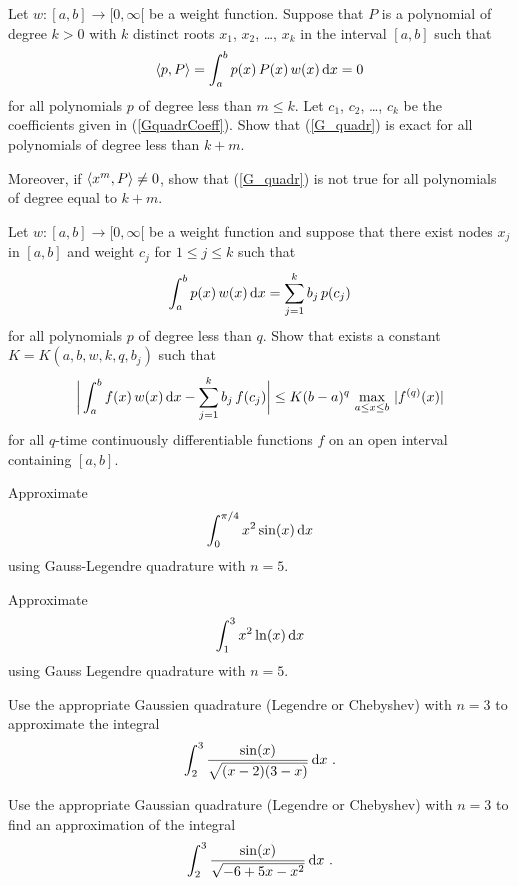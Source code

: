 \begin{question}
Let $w:[a,b] \rightarrow [0,\infty[$ be a weight function.  Suppose
that $P$ is a polynomial of degree $k>0$ with $k$ distinct roots
$x_1$, $x_2$, \ldots, $x_k$ in the interval $[a,b]$ such that
\[
  \left\langle{p} , {P}\right\rangle = \int_a^b p(x)\,P(x)\,w(x) \,\mathrm{d}x = 0
\]
for all polynomials $p$ of degree less than $m \leq k$.
Let $c_1$, $c_2$, \ldots, $c_k$ be the coefficients given in
(\ref{GquadrCoeff}).  Show that (\ref{G_quadr}) is
exact for all polynomials of degree less than $k+m$.

Moreover, if $\left\langle{x^m} , {P}\right\rangle \neq 0$, show that (\ref{G_quadr}) is
not true for all polynomials of degree equal to $k+m$.
\label{diffQ25}
\end{question}

\begin{question}
Let $w:[a,b]\to [0,\infty[$ be a weight function and suppose that there exist
nodes $x_j$ in $[a,b]$ and weight $c_j$ for $1\leq j \leq k$ such that
\[
\int_a^b p(x)\,w(x)\,\mathrm{d}x = \sum_{j=1}^k b_j\,p(c_j)
\]
for all polynomials $p$ of degree less than $q$.
Show that exists a constant $K = K(a,b,w,k,q,b_j)$ such that
\[
\bigg| \int_a^b  f(x)\,w(x)\,\mathrm{d}x - \sum_{j=1}^k b_j\,f(c_j)
\bigg| \leq K (b-a)^q \, \max_{a\leq x \leq b}\, |f^{(q)}(x)|
\]
for all $q$-time continuously differentiable functions
$f$ on an open interval containing $[a,b]$.
\label{diffQ26}
\end{question}

\begin{question}
Approximate
\[
  \int_0^{\pi/4} x^2 \sin(x) \,\mathrm{d}x
\]
using Gauss-Legendre quadrature with $n=5$.
\label{diffQ27}
\end{question}

\begin{question}
Approximate
\begin{equation} \label{gauss_quadr}
\int_1^3 x^2 \ln(x) \,\mathrm{d}x
\end{equation}
using Gauss Legendre quadrature with $n=5$.
\label{diffQ28}
\end{question}

\begin{question}
Use the appropriate Gaussien quadrature (Legendre or Chebyshev) with
$n=3$ to approximate the integral
\[
\int_2^3 \frac{\sin(x)}{\sqrt{(x-2)(3-x)}} \,\mathrm{d}x \ .
\]
\label{diffQ29}
\end{question}

\begin{question}
Use the appropriate Gaussian quadrature (Legendre or Chebyshev) with
$n=3$ to find an approximation of the integral
\[
\int_2^3 \frac{\sin(x)}{\sqrt{-6+5x-x^2}} \,\mathrm{d}x \ .
\]
\label{diffQ30}
\end{question}

